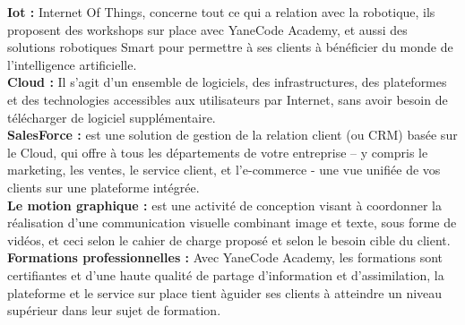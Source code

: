 \textbf{Iot :}
Internet Of Things, concerne tout ce qui a relation avec la robotique, ils
proposent des workshops sur place avec YaneCode Academy, et aussi des solutions
robotiques Smart pour permettre à ses clients à bénéficier du monde de l’intelligence artificielle.\\

\textbf{Cloud :}
 Il s’agit d’un ensemble de logiciels, des infrastructures, des plateformes et des technologies accessibles aux utilisateurs par Internet, sans avoir besoin de télécharger de logiciel supplémentaire.\\
 
\textbf{SalesForce :}
est une solution de gestion de la relation client (ou CRM) basée sur
le Cloud, qui offre à tous les départements de votre entreprise – y compris le marketing, les ventes, le service client, et l’e-commerce - une vue unifiée de vos clients sur une plateforme intégrée.\\

\textbf{Le motion graphique :}
 est une activité de conception visant à coordonner la
réalisation d'une communication visuelle combinant image et texte, sous forme de vidéos, et ceci selon le cahier de charge proposé et selon le besoin cible du client.\\

\textbf{Formations professionnelles :}
 Avec YaneCode Academy, les formations sont
certifiantes et d’une haute qualité de partage d’information et d’assimilation, la plateforme et le service sur place tient àguider ses clients à atteindre un niveau supérieur dans leur sujet de formation.\\

\clearpage
